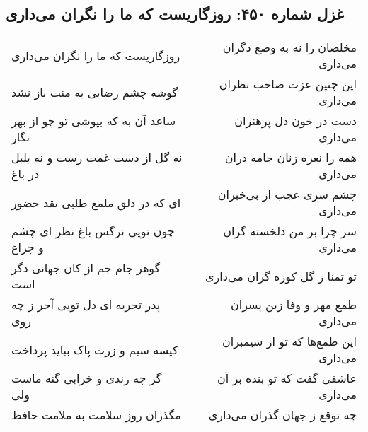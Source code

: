 \begin{center}
\section*{غزل شماره ۴۵۰: روزگاریست که ما را نگران می‌داری}
\label{sec:sh450}
\begin{longtable}{l p{0.5cm} r}
روزگاریست که ما را نگران می‌داری
&&
مخلصان را نه به وضع دگران می‌داری
\\
گوشه چشم رضایی به منت باز نشد
&&
این چنین عزت صاحب نظران می‌داری
\\
ساعد آن به که بپوشی تو چو از بهر نگار
&&
دست در خون دل پرهنران می‌داری
\\
نه گل از دست غمت رست و نه بلبل در باغ
&&
همه را نعره زنان جامه دران می‌داری
\\
ای که در دلق ملمع طلبی نقد حضور
&&
چشم سری عجب از بی‌خبران می‌داری
\\
چون تویی نرگس باغ نظر ای چشم و چراغ
&&
سر چرا بر من دلخسته گران می‌داری
\\
گوهر جام جم از کان جهانی دگر است
&&
تو تمنا ز گل کوزه گران می‌داری
\\
پدر تجربه ای دل تویی آخر ز چه روی
&&
طمع مهر و وفا زین پسران می‌داری
\\
کیسه سیم و زرت پاک بباید پرداخت
&&
این طمع‌ها که تو از سیمبران می‌داری
\\
گر چه رندی و خرابی گنه ماست ولی
&&
عاشقی گفت که تو بنده بر آن می‌داری
\\
مگذران روز سلامت به ملامت حافظ
&&
چه توقع ز جهان گذران می‌داری
\\
\end{longtable}
\end{center}
